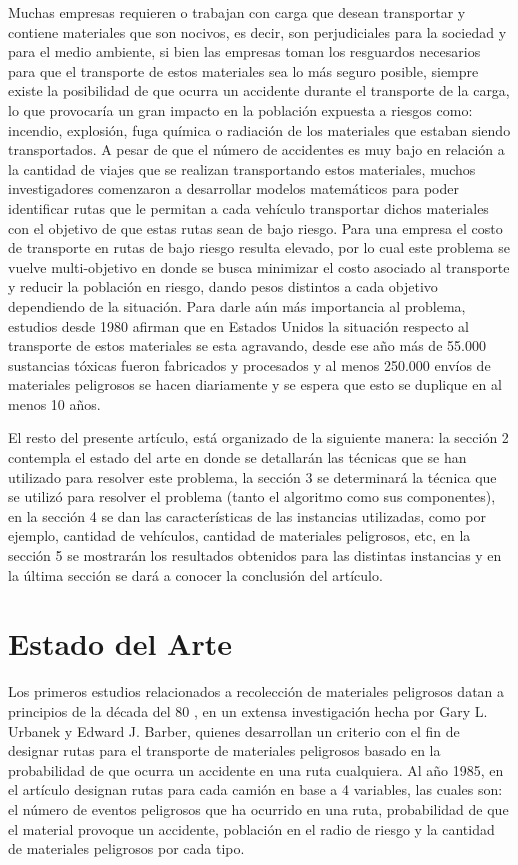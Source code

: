 \documentclass[conference]{IEEEtran}
\begin{document}
Muchas empresas requieren o trabajan con carga que desean transportar y contiene materiales que son nocivos, es decir, son perjudiciales para la sociedad y para el medio ambiente, si bien las empresas toman los resguardos necesarios para que el transporte de estos materiales sea lo m\'as seguro posible, siempre existe la posibilidad \cite{b1} de que ocurra un accidente durante el transporte de la carga, lo que provocar\'ia un gran impacto en la poblaci\'on expuesta a riesgos \cite{b2} como: incendio, explosi\'on, fuga qu\'imica o radiaci\'on  de los materiales que estaban siendo transportados. A pesar de que el n\'umero de accidentes es muy bajo en relaci\'on a la cantidad de viajes que se realizan transportando estos materiales, muchos investigadores comenzaron a desarrollar modelos matem\'aticos para poder identificar rutas que le permitan a cada veh\'iculo transportar dichos materiales con el objetivo de que estas rutas sean de bajo riesgo. Para una empresa el costo de transporte en rutas de bajo riesgo resulta elevado, por lo cual este problema se vuelve multi-objetivo en donde se busca minimizar el costo asociado al transporte y reducir la poblaci\'on en riesgo, dando pesos distintos a cada objetivo dependiendo de la situaci\'on. Para darle a\'un m\'as importancia al problema, estudios desde 1980 afirman \cite{b3} que en Estados Unidos la situaci\'on respecto al transporte de estos materiales se esta agravando, desde ese a\~no m\'as de 55.000 sustancias t\'oxicas fueron fabricados y procesados y al menos 250.000 env\'ios de materiales peligrosos se hacen diariamente y se espera que esto se duplique en al menos 10 a\~nos.

El resto del presente art\'iculo, est\'a organizado de la siguiente manera: la secci\'on 2 contempla el estado del arte en donde se detallar\'an las t\'ecnicas que se han utilizado para resolver este problema, la secci\'on 3 se determinar\'a la t\'ecnica que se utiliz\'o para resolver el problema (tanto el algoritmo como sus componentes), en la secci\'on 4 se dan las caracter\'isticas de las instancias utilizadas, como por ejemplo, cantidad de veh\'iculos, cantidad de materiales peligrosos, etc, en la secci\'on 5 se mostrar\'an los resultados obtenidos para las distintas instancias y en la \'ultima secci\'on se dar\'a a conocer la conclusi\'on del art\'iculo.

\section{Estado del Arte}
Los primeros estudios relacionados a recolecci\'on de materiales peligrosos datan a principios de la d\'ecada del 80 \cite{b4}, en un extensa investigaci\'on hecha por Gary L. Urbanek y Edward J. Barber, quienes desarrollan un criterio con el fin de designar rutas para el transporte de materiales peligrosos basado en la probabilidad de que ocurra un accidente en una ruta cualquiera. Al a\~no 1985, en el art\'iculo \cite{b3} designan rutas para cada cami\'on en base a 4 variables, las cuales son: el n\'umero de eventos peligrosos que ha ocurrido en una ruta, probabilidad de que el material provoque un accidente, poblaci\'on en el radio de riesgo y la cantidad de materiales peligrosos por cada tipo. 
\end{document}
